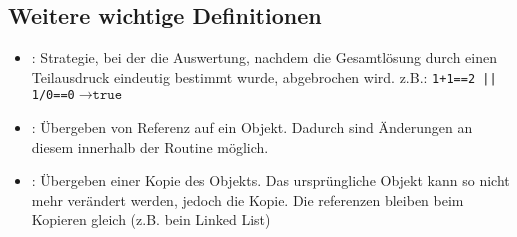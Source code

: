 \documentclass[
    12pt,
    a4paper,
    ngerman,
    color=3b,%
    marginpar=false,
    colorback=false,
    leqno,
]{tudaexercise}
\begin{document}
\subsection{Weitere wichtige Definitionen}
\begin{itemize}
    \item {}: Strategie, bei der die Auswertung, nachdem die Gesamtlösung durch einen Teilausdruck eindeutig bestimmt wurde, abgebrochen wird. 
    z.B.: \texttt{1+1==2 || 1/0==0}$\longrightarrow \texttt{true}$
    \item {}: Übergeben von Referenz auf ein Objekt. Dadurch sind Änderungen an diesem innerhalb der Routine möglich.
    \item {}: Übergeben einer Kopie des Objekts. Das ursprüngliche Objekt kann so nicht mehr verändert werden, jedoch die Kopie. Die referenzen bleiben beim Kopieren gleich (z.B. bein Linked List)
\end{itemize}
\clearpage
\end{document}
